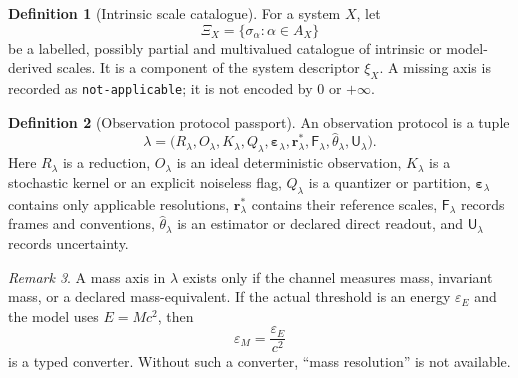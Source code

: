 \documentclass[11pt,a4paper]{article}
\theoremstyle{definition}
\newtheorem{definition}{Definition}[section]
\theoremstyle{plain}
\theoremstyle{remark}
\newtheorem{remark}[definition]{Remark}
\newcommand{\Tcal}{\mathcal{T}}
\begin{document}
\begin{definition}[Intrinsic scale catalogue]
For a system $X$, let
\[
 \Xi_X=\{\sigma_\alpha:\alpha\in A_X\}
\]
be a labelled, possibly partial and multivalued catalogue of intrinsic
or model-derived scales. It is a component of the system descriptor
$\xi_X$. A missing axis is recorded as \texttt{not-applicable}; it is
not encoded by $0$ or $+\infty$.
\end{definition}

\begin{definition}[Observation protocol passport]
An observation protocol is a tuple
\[
\lambda=
\bigl(
R_\lambda,O_\lambda,K_\lambda,Q_\lambda,
\bm\varepsilon_\lambda,\bm r_\lambda^*,
\mathsf F_\lambda,\widehat\theta_\lambda,
\mathsf U_\lambda
\bigr).
\]
Here $R_\lambda$ is a reduction, $O_\lambda$ is an ideal deterministic
observation, $K_\lambda$ is a stochastic kernel or an explicit noiseless
flag, $Q_\lambda$ is a quantizer or partition,
$\bm\varepsilon_\lambda$ contains only applicable resolutions,
$\bm r_\lambda^*$ contains their reference scales,
$\mathsf F_\lambda$ records frames and conventions,
$\widehat\theta_\lambda$ is an estimator or declared direct readout, and
$\mathsf U_\lambda$ records uncertainty.
\end{definition}

\begin{center}
\end{center}

\begin{remark}
A mass axis in $\lambda$ exists only if the channel measures mass,
invariant mass, or a declared mass-equivalent. If the actual threshold is
an energy $\varepsilon_E$ and the model uses $E=Mc^2$, then
\[
 \varepsilon_M=\frac{\varepsilon_E}{c^2}
\]
is a typed converter. Without such a converter, ``mass resolution'' is
not available.
\end{remark}
\end{document}
